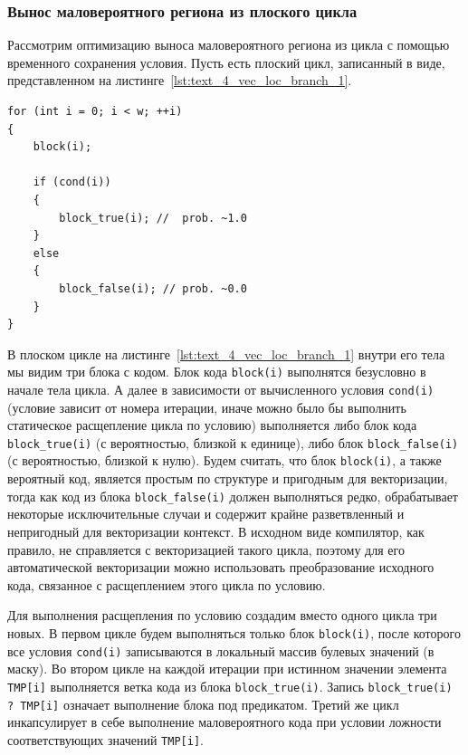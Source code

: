 \subsubsection{Вынос маловероятного региона из плоского цикла}

Рассмотрим оптимизацию выноса маловероятного региона из цикла с помощью временного сохранения условия.
Пусть есть плоский цикл, записанный в виде, представленном на листинге~\ref{lst:text_4_vec_loc_branch_1}.

\begin{lstlisting}[caption={Плоский цикл с маловероятным регионом.},label={lst:text_4_vec_loc_branch_1}]
for (int i = 0; i < w; ++i)
{
    block(i);
    
    if (cond(i))
    {
        block_true(i); //  prob. ~1.0
    }
    else
    {
        block_false(i); // prob. ~0.0
    }
}
\end{lstlisting}

В плоском цикле на листинге~\ref{lst:text_4_vec_loc_branch_1} внутри его тела мы видим три блока с кодом.
Блок кода \texttt{block(i)} выполнятся безусловно в начале тела цикла.
А далее в зависимости от вычисленного условия \texttt{cond(i)} (условие зависит от номера итерации, иначе можно было бы выполнить статическое расщепление цикла по условию) выполняется либо блок кода \texttt{block\_true(i)} (с вероятностью, близкой к единице), либо блок \texttt{block\_false(i)} (с вероятностью, близкой к нулю).
Будем считать, что блок \texttt{block(i)}, а также вероятный код, является простым по структуре и пригодным для векторизации, тогда как код из блока \texttt{block\_false(i)} должен выполняться редко, обрабатывает некоторые исключительные случаи и содержит крайне разветвленный и непригодный для векторизации контекст.
В исходном виде компилятор, как правило, не справляется с векторизацией такого цикла, поэтому для его автоматической векторизации можно использовать преобразование исходного кода, связанное с расщеплением этого цикла по условию.

Для выполнения расщепления по условию создадим вместо одного цикла три новых.
В первом цикле будем выполняться только блок \texttt{block(i)}, после которого все условия \texttt{cond(i)} записываются в локальный массив булевых значений (в маску).
Во втором цикле на каждой итерации при истинном значении элемента \texttt{TMP[i]} выполняется ветка кода из блока \texttt{block\_true(i)}.
Запись \texttt{block\_true(i) ? TMP[i]} означает выполнение блока под предикатом.
Третий же цикл инкапсулирует в себе выполнение маловероятного кода при условии ложности соответствующих значений \texttt{TMP[i]}.


